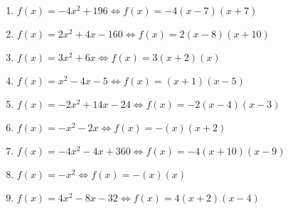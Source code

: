 \documentclass{article}%
\begin{document}
\begin{enumerate}[label=\alph*)]
\item%
\newline\vspace{0.5cm}$f(x)=-4x^2 + 196\Leftrightarrow f(x)=-4(x-7)(x+7)$%
\item%
\newline\vspace{0.5cm}$f(x)=2x^2 + 4x - 160\Leftrightarrow f(x)=2(x-8)(x+10)$%
\item%
\newline\vspace{0.5cm}$f(x)=3x^2 + 6x\Leftrightarrow f(x)=3(x+2)(x)$%
\item%
\newline\vspace{0.5cm}$f(x)=x^2 - 4x - 5\Leftrightarrow f(x)=(x+1)(x-5)$%
\item%
\newline\vspace{0.5cm}$f(x)=-2x^2 + 14x - 24\Leftrightarrow f(x)=-2(x-4)(x-3)$%
\item%
\newline\vspace{0.5cm}$f(x)=-x^2 - 2x\Leftrightarrow f(x)=-(x)(x+2)$%
\item%
\newline\vspace{0.5cm}$f(x)=-4x^2 - 4x + 360\Leftrightarrow f(x)=-4(x+10)(x-9)$%
\item%
\newline\vspace{0.5cm}$f(x)=-x^2\Leftrightarrow f(x)=-(x)(x)$%
\item%
\newline\vspace{0.5cm}$f(x)=4x^2 - 8x - 32\Leftrightarrow f(x)=4(x+2)(x-4)$%
\end{enumerate}

%
\end{document}

